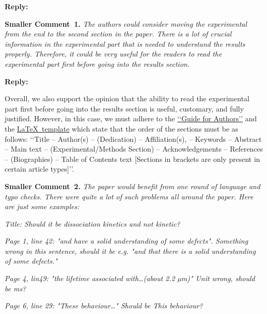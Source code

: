 \documentclass{WileyMSP-template}
\begin{document}
\noindent
\textcolor[rgb]{0.51,0.00,0.00}{\textbf{Reply:}}


\vspace{1cm}
\noindent
\textcolor[rgb]{0.00,0.50,1.00}{\textbf{Smaller Comment~1.}}
\emph{The authors could consider moving the experimental from the end to the second section in the paper.
There is a lot of crucial information in the experimental part that is needed to understand the results properly.
Therefore, it could be very useful for the readers to read the experimental part first before going into the results section.}

\noindent
\textcolor[rgb]{0.51,0.00,0.00}{\textbf{Reply:}}

Overall, we also support the opinion that the ability to read the experimental part first
before going into the results section is useful, customary, and fully justified.
However, in this case, we must adhere to the
\href{https://onlinelibrary.wiley.com/page/journal/18626319/homepage/author-guidelines}{‘‘Guide for Authors’’}
and the
\href{https://onlinelibrary.wiley.com/pb-assets/assets/vch/msp/LaTeX-template-1593698612150.zip}{\LaTeX~template}
which state that the order of the sections must be as follows:
‘‘Title -- Author(s) -- (Dedication) -- Affiliation(s), -- Keywords --
Abstract -- Main text -- (Experimental/Methods Section) -- Acknowledgements -- References -- (Biographies) -- Table of Contents text
 [Sections in brackets are only present in certain article types]’’.


\vspace{1cm}
\noindent
\textcolor[rgb]{0.00,0.50,1.00}{\textbf{Smaller Comment~2.}}
\emph{The paper would benefit from one round of language and typo checks.
There were quite a lot of such problems all around the paper.
Here are just some examples:}

\emph{Title: Should it be dissociation kinetics and not kinetic?}

\emph{Page 1, line 42:
"and have a solid understanding of some defects".
Something wrong in this sentence,
should it be e.g. "and that there is a solid understanding of some defects."}

\emph{
Page 4, lin49: "the lifetime associated with…(about 2.2 µm)" Unit wrong, should be ms?}

\emph{
Page 6, line 29: "These behaviour…" Should be This behaviour?}
\end{document}
